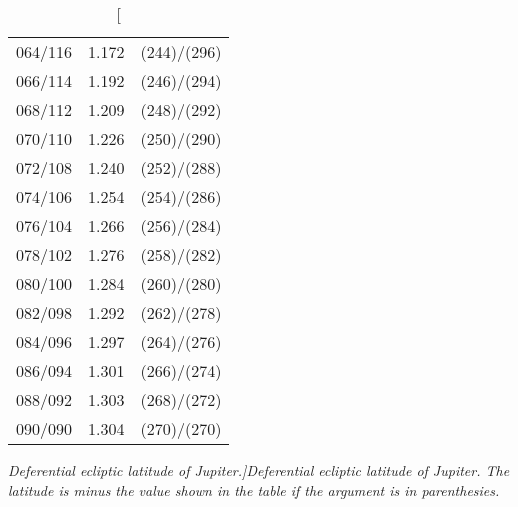 \begin{table}
{\begin{tabular}{crc}
064/116 &  1.172 & (244)/(296)\\
066/114 &  1.192 & (246)/(294)\\
068/112 &  1.209 & (248)/(292)\\
070/110 &  1.226 & (250)/(290)\\
072/108 &  1.240 & (252)/(288)\\
074/106 &  1.254 & (254)/(286)\\
076/104 &  1.266 & (256)/(284)\\
078/102 &  1.276 & (258)/(282)\\
080/100 &  1.284 & (260)/(280)\\
082/098 &  1.292 & (262)/(278)\\
084/096 &  1.297 & (264)/(276)\\
086/094 &  1.301 & (266)/(274)\\
088/092 &  1.303 & (268)/(272)\\
090/090 &  1.304 & (270)/(270)\\
\end{tabular}}
\caption[\em Deferential ecliptic latitude of Jupiter.]{\em Deferential ecliptic latitude of Jupiter.  The latitude is minus the value shown
in the table if the argument is
in parenthesies. }\label{tlat1j}
\end{table}

